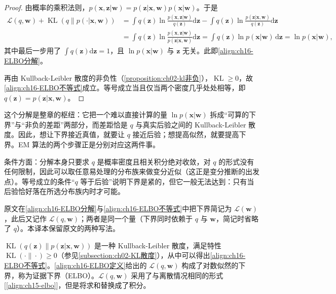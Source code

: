 \documentclass[../../main.tex]{subfiles}
\begin{document}
\begin{proof}
由概率的乘积法则，$p(\bm{x},\bm{z}|\bm{w})=p(\bm{z}|\bm{x},\bm{w})p(\bm{x}|\bm{w})$。于是
\begin{align*}
  \mathcal{L}(q,\bm{w})+\operatorname{KL}\left(q\|p(\cdot|\bm{x},\bm{w})\right)
  &=\int q(\bm{z})\ln\frac{p(\bm{x},\bm{z}|\bm{w})}{q(\bm{z})}\mathrm{d}\bm{z}-\int q(\bm{z})\ln\frac{p(\bm{z}|\bm{x},\bm{w})}{q(\bm{z})}\mathrm{d}\bm{z}\\
  &=\int q(\bm{z})\ln\frac{p(\bm{x},\bm{z}|\bm{w})}{p(\bm{z}|\bm{x},\bm{w})}\mathrm{d}\bm{z}
  =\int q(\bm{z})\ln p(\bm{x}|\bm{w})\,\mathrm{d}\bm{z}=\ln p(\bm{x}|\bm{w}),
\end{align*}
其中最后一步用了 $\int q(\bm{z})\mathrm{d}\bm{z}=1$，且 $\ln p(\bm{x}|\bm{w})$ 与 $\bm{z}$ 无关。此即\eqref{align:ch16-ELBO分解}。

再由 Kullback-Leibler 散度的非负性（\cref{proposition:ch02-kl非负}），$\operatorname{KL}\geqslant0$，故\eqref{align:ch16-ELBO不等式}成立。等号成立当且仅当两个密度几乎处处相等，即 $q(\bm{z})=p(\bm{z}|\bm{x},\bm{w})$。
\end{proof}

\begin{remark}
这个分解是整章的枢纽：它把一个难以直接计算的量 $\ln p(\bm{x}|\bm{w})$ 拆成“可算的下界”与“非负的差距”两部分，而差距恰是 $q$ 与真实后验之间的 Kullback-Leibler 散度。因此，想让下界接近真值，就要让 $q$ 接近后验；想提高似然，就要提高下界。EM 算法的两个步骤正是分别对应这两件事。

条件方面：分解本身只要求 $q$ 是概率密度且相关积分绝对收敛，对 $q$ 的形式没有任何限制，因此可以取任意易处理的分布族来做变分近似（这正是变分推断的出发点）。等号成立的条件“$q$ 等于后验”说明下界是紧的，但它一般无法达到：只有当后验恰好落在所选分布族内时才可能。

原文在\eqref{align:ch16-ELBO分解}与\eqref{align:ch16-ELBO不等式}中把下界简记为 $\mathcal{L}(\bm{w})$，此后又记作 $\mathcal{L}(q,\bm{w})$；两者是同一个量（下界同时依赖于 $q$ 与 $\bm{w}$，简记时省略了 $q$）。本译本保留原文的两种写法。
\end{remark}

$\operatorname{KL}(q(\bm{z})\|p(\bm{z}|\bm{x},\bm{w}))$ 是一种 Kullback-Leibler 散度，满足特性 $\operatorname{KL}(\cdot\|\cdot)\geqslant0$（参见\cref{subsection:ch02-KL散度}），从中可以得出\eqref{align:ch16-ELBO不等式}。\eqref{align:ch16-ELBO定义}给出的 $\mathcal{L}(q,\bm{w})$ 构成了对数似然的下界，称为证据下界（ELBO）。$\mathcal{L}(q,\bm{w})$ 采用了与离散情况相同的形式[\eqref{align:ch15-elbo}]，但是将求和替换成了积分。
\end{document}
